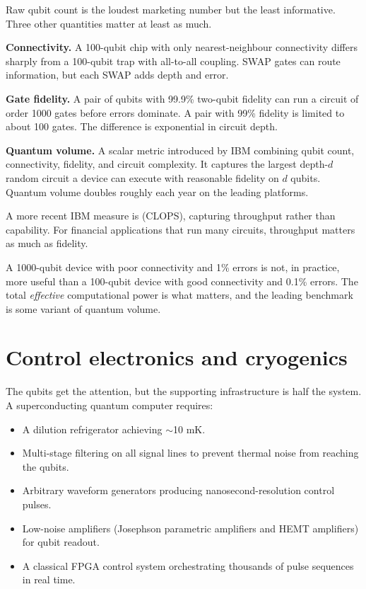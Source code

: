 Raw qubit count is the loudest marketing number but the least informative. Three other quantities matter at least as much.

\textbf{Connectivity.} A 100-qubit chip with only nearest-neighbour connectivity differs sharply from a 100-qubit trap with all-to-all coupling. SWAP gates can route information, but each SWAP adds depth and error.

\textbf{Gate fidelity.} A pair of qubits with 99.9\% two-qubit fidelity can run a circuit of order 1000 gates before errors dominate. A pair with 99\% fidelity is limited to about 100 gates. The difference is exponential in circuit depth.

\textbf{Quantum volume.} A scalar metric introduced by IBM combining qubit count, connectivity, fidelity, and circuit complexity. It captures the largest depth-$d$ random circuit a device can execute with reasonable fidelity on $d$ qubits. Quantum volume doubles roughly each year on the leading platforms.

A more recent IBM measure is  (CLOPS), capturing throughput rather than capability. For financial applications that run many circuits, throughput matters as much as fidelity.

\begin{remark}
A 1000-qubit device with poor connectivity and 1\% errors is not, in practice, more useful than a 100-qubit device with good connectivity and 0.1\% errors. The total \emph{effective} computational power is what matters, and the leading benchmark is some variant of quantum volume.
\end{remark}

\section{Control electronics and cryogenics}

The qubits get the attention, but the supporting infrastructure is half the system. A superconducting quantum computer requires:

\begin{itemize}
\item A dilution refrigerator achieving $\sim$10 mK.
\item Multi-stage filtering on all signal lines to prevent thermal noise from reaching the qubits.
\item Arbitrary waveform generators producing nanosecond-resolution control pulses.
\item Low-noise amplifiers (Josephson parametric amplifiers and HEMT amplifiers) for qubit readout.
\item A classical FPGA control system orchestrating thousands of pulse sequences in real time.
\end{itemize}

